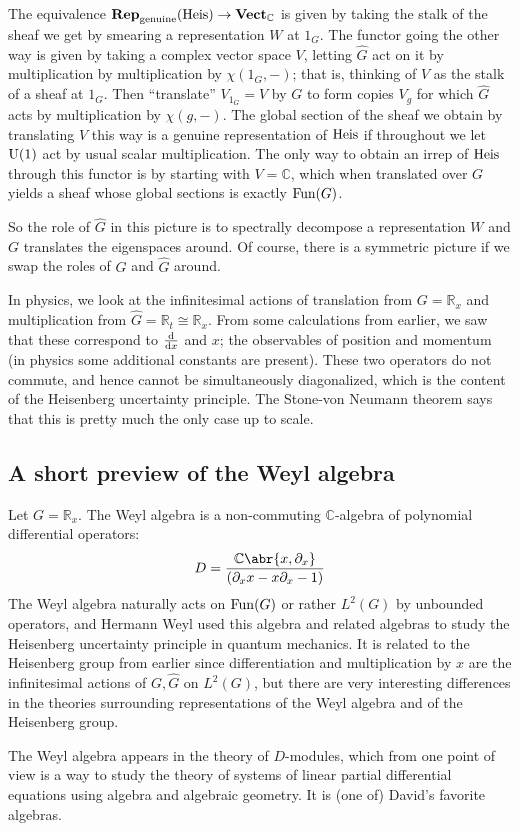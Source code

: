 \documentclass[../../rtnotes.tex]{subfiles}
\begin{document}
The equivalence ${\normalfont\mathbf{Rep}}_{\textrm{genuine}}(\operatorname{Heis})\to {\normalfont\mathbf{Vect}}_{\mathbb C}$ is given by taking the stalk of the sheaf we get by smearing a representation $W$ at $1_G$. The functor going the other way is given by taking a complex vector space $V$, letting $\widehat G$ act on it by multiplication by multiplication by $\chi(1_G,-)$; that is, thinking of $V$ as the stalk of a sheaf at $1_G$. Then ``translate'' $V_{1_G} = V$ by $G$ to form copies $V_g$ for which $\widehat G$ acts by multiplication by $\chi(g,-)$. The global section of the sheaf we obtain by translating $V$ this way is a genuine representation of $\operatorname{Heis}$ if throughout we let $\operatorname{U}(1)$ act by usual scalar multiplication. The only way to obtain an irrep of $\operatorname{Heis}$ through this functor is by starting with $V = \mathbb C$, which when translated over $G$ yields a sheaf whose global sections is exactly $\operatorname{Fun}(G)$.

So the role of $\widehat G$ in this picture is to spectrally decompose a representation $W$ and $G$ translates the eigenspaces around. Of course, there is a symmetric picture if we swap the roles of $G$ and $\widehat G$ around.

In physics, we look at the infinitesimal actions of translation from $G = \mathbb R_x$ and multiplication from $\widehat G = \mathbb R_t\cong \mathbb R_x$. From some calculations from earlier, we saw that these correspond to $\dv{x}$ and $x$; the observables of position and momentum (in physics some additional constants are present). These two operators do not commute, and hence cannot be simultaneously diagonalized, which is the content of the Heisenberg uncertainty principle. The Stone-von Neumann theorem says that this is pretty much the only case up to scale.

\subsection{A short preview of the Weyl algebra}
Let $G = \mathbb R_x$. The Weyl algebra is a non-commuting $\mathbb C$-algebra of polynomial differential operators:
\[D = \frac{\mathbb C\abr{x,\partial_x}}{(\partial_xx-x\partial_x - 1)}\]
The Weyl algebra naturally acts on $\operatorname{Fun}(G)$ or rather $L^2(G)$ by unbounded operators, and Hermann Weyl used this algebra and related algebras to study the Heisenberg uncertainty principle in quantum mechanics. It is related to the Heisenberg group from earlier since differentiation and multiplication by $x$ are the infinitesimal actions of $G, \widehat G$ on $L^2(G)$, but there are very interesting differences in the theories surrounding representations of the Weyl algebra and of the Heisenberg group.

The Weyl algebra appears in the theory of $D$-modules, which from one point of view is a way to study the theory of systems of linear partial differential equations using algebra and algebraic geometry. It is (one of) David's favorite algebras.
\end{document}
